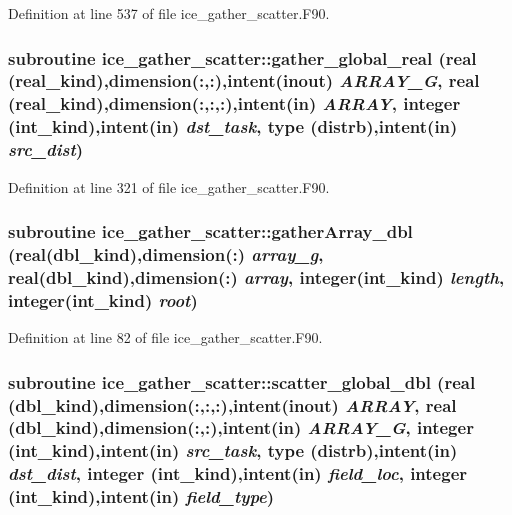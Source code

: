 Definition at line 537 of file ice\_\-gather\_\-scatter.F90.\hypertarget{namespaceice__gather__scatter_a3bfaad5ff40eaa2c23e804f7e75d51f9}{
\subsubsection[{gather\_\-global\_\-real}]{\setlength{\rightskip}{0pt plus 5cm}subroutine ice\_\-gather\_\-scatter::gather\_\-global\_\-real (real (real\_\-kind),dimension(:,:),intent(inout) {\em ARRAY\_\-G}, \/  real (real\_\-kind),dimension(:,:,:),intent(in) {\em ARRAY}, \/  integer (int\_\-kind),intent(in) {\em dst\_\-task}, \/  type (distrb),intent(in) {\em src\_\-dist})}}
\label{namespaceice__gather__scatter_a3bfaad5ff40eaa2c23e804f7e75d51f9}


Definition at line 321 of file ice\_\-gather\_\-scatter.F90.\hypertarget{namespaceice__gather__scatter_af2e301c3ae3447184de4cf26a6adae4c}{
\subsubsection[{gatherArray\_\-dbl}]{\setlength{\rightskip}{0pt plus 5cm}subroutine ice\_\-gather\_\-scatter::gatherArray\_\-dbl (real(dbl\_\-kind),dimension(:) {\em array\_\-g}, \/  real(dbl\_\-kind),dimension(:) {\em array}, \/  integer(int\_\-kind) {\em length}, \/  integer(int\_\-kind) {\em root})}}
\label{namespaceice__gather__scatter_af2e301c3ae3447184de4cf26a6adae4c}


Definition at line 82 of file ice\_\-gather\_\-scatter.F90.\hypertarget{namespaceice__gather__scatter_a0cdcbc669124b62ca3daae1382379d53}{
\subsubsection[{scatter\_\-global\_\-dbl}]{\setlength{\rightskip}{0pt plus 5cm}subroutine ice\_\-gather\_\-scatter::scatter\_\-global\_\-dbl (real (dbl\_\-kind),dimension(:,:,:),intent(inout) {\em ARRAY}, \/  real (dbl\_\-kind),dimension(:,:),intent(in) {\em ARRAY\_\-G}, \/  integer (int\_\-kind),intent(in) {\em src\_\-task}, \/  type (distrb),intent(in) {\em dst\_\-dist}, \/  integer (int\_\-kind),intent(in) {\em field\_\-loc}, \/  integer (int\_\-kind),intent(in) {\em field\_\-type})}}
\label{namespaceice__gather__scatter_a0cdcbc669124b62ca3daae1382379d53}


